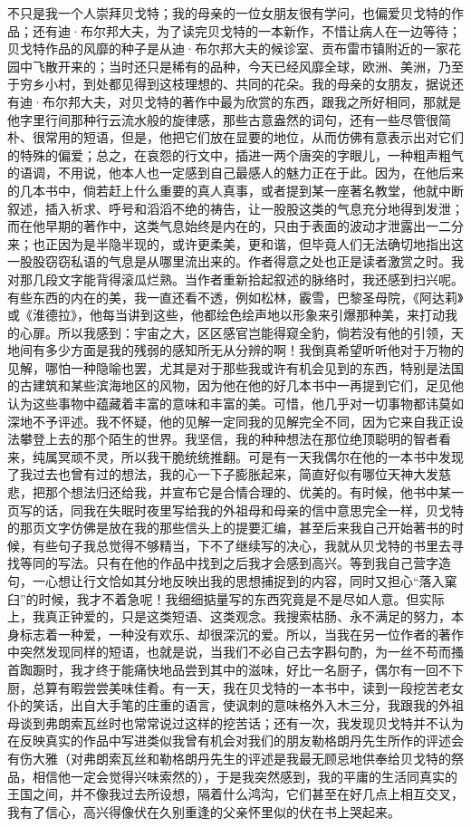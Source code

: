 \par 不只是我一个人崇拜贝戈特；我的母亲的一位女朋友很有学问，也偏爱贝戈特的作品；还有迪·布尔邦大夫，为了读完贝戈特的一本新作，不惜让病人在一边等待；贝戈特作品的风靡的种子是从迪·布尔邦大夫的候诊室、贡布雷市镇附近的一家花园中飞散开来的；当时还只是稀有的品种，今天已经风靡全球，欧洲、美洲，乃至于穷乡小村，到处都见得到这枝理想的、共同的花朵。我的母亲的女朋友，据说还有迪·布尔邦大夫，对贝戈特的著作中最为欣赏的东西，跟我之所好相同，那就是他字里行间那种行云流水般的旋律感，那些古意盎然的词句，还有一些尽管很简朴、很常用的短语，但是，他把它们放在显要的地位，从而仿佛有意表示出对它们的特殊的偏爱；总之，在哀怨的行文中，插进一两个唐突的字眼儿，一种粗声粗气的语调，不用说，他本人也一定感到自己最感人的魅力正在于此。因为，在他后来的几本书中，倘若赶上什么重要的真人真事，或者提到某一座著名教堂，他就中断叙述，插入祈求、呼号和滔滔不绝的祷告，让一股股这类的气息充分地得到发泄；而在他早期的著作中，这类气息始终是内在的，只由于表面的波动才泄露出一二分来；也正因为是半隐半现的，或许更柔美，更和谐，但毕竟人们无法确切地指出这一股股窃窃私语的气息是从哪里流出来的。作者得意之处也正是读者激赏之时。我对那几段文字能背得滚瓜烂熟。当作者重新拾起叙述的脉络时，我还感到扫兴呢。有些东西的内在的美，我一直还看不透，例如松林，霰雪，巴黎圣母院，《阿达莉》或《淮德拉》，他每当讲到这些，他都绘色绘声地以形象来引爆那种美，来打动我的心扉。所以我感到：宇宙之大，区区感官岂能得窥全豹，倘若没有他的引领，天地间有多少方面是我的残弱的感知所无从分辨的啊！我倒真希望听听他对于万物的见解，哪怕一种隐喻也罢，尤其是对于那些我或许有机会见到的东西，特别是法国的古建筑和某些滨海地区的风物，因为他在他的好几本书中一再提到它们，足见他认为这些事物中蕴藏着丰富的意味和丰富的美。可惜，他几乎对一切事物都讳莫如深地不予评述。我不怀疑，他的见解一定同我的见解完全不同，因为它来自我正设法攀登上去的那个陌生的世界。我坚信，我的种种想法在那位绝顶聪明的智者看来，纯属冥顽不灵，所以我干脆统统推翻。可是有一天我偶尔在他的一本书中发现了我过去也曾有过的想法，我的心一下子膨胀起来，简直好似有哪位天神大发慈悲，把那个想法归还给我，并宣布它是合情合理的、优美的。有时候，他书中某一页写的话，同我在失眠时夜里写给我的外祖母和母亲的信中意思完全一样，贝戈特的那页文字仿佛是放在我的那些信头上的提要汇编，甚至后来我自己开始著书的时候，有些句子我总觉得不够精当，下不了继续写的决心，我就从贝戈特的书里去寻找等同的写法。只有在他的作品中找到之后我才会感到高兴。等到我自己营字造句，一心想让行文恰如其分地反映出我的思想捕捉到的内容，同时又担心“落入窠臼”的时候，我才不着急呢！我细细掂量写的东西究竟是不是尽如人意。但实际上，我真正钟爱的，只是这类短语、这类观念。我搜索枯肠、永不满足的努力，本身标志着一种爱，一种没有欢乐、却很深沉的爱。所以，当我在另一位作者的著作中突然发现同样的短语，也就是说，当我们不必自己去字斟句酌，为一丝不苟而搔首踟蹰时，我才终于能痛快地品尝到其中的滋味，好比一名厨子，偶尔有一回不下厨，总算有暇尝尝美味佳肴。有一天，我在贝戈特的一本书中，读到一段挖苦老女仆的笑话，出自大手笔的庄重的语言，使讽刺的意味格外入木三分，我跟我的外祖母谈到弗朗索瓦丝时也常常说过这样的挖苦话；还有一次，我发现贝戈特并不认为在反映真实的作品中写进类似我曾有机会对我们的朋友勒格朗丹先生所作的评述会有伤大雅（对弗朗索瓦丝和勒格朗丹先生的评述是我最无顾忌地供奉给贝戈特的祭品，相信他一定会觉得兴味索然的），于是我突然感到，我的平庸的生活同真实的王国之间，并不像我过去所设想，隔着什么鸿沟，它们甚至在好几点上相互交叉，我有了信心，高兴得像伏在久别重逢的父亲怀里似的伏在书上哭起来。
